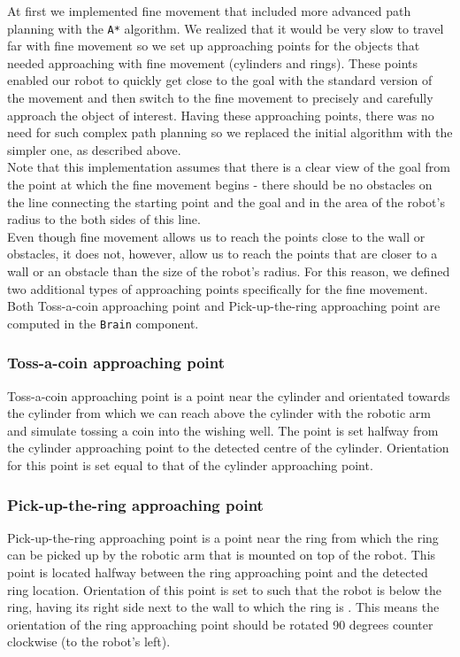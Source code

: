 \documentclass[12pt,a4paper]{article}
\begin{document}
	At first we implemented fine movement that included more advanced path planning with the \texttt{A*} algorithm. We realized that it would be very slow to travel far with fine movement so we set up approaching points for the objects that needed approaching with fine movement (cylinders and rings). These points enabled our robot to quickly get close to the goal with the standard version of the movement and then switch to the fine movement to precisely and carefully approach the object of interest. Having these approaching points, there was no need for such complex path planning so we replaced the initial algorithm with the simpler one, as described above. \\
	
	Note that this implementation assumes that there is a clear view of the goal from the point at which the fine movement begins - there should be no obstacles on the line connecting the starting point and the goal and in the area of the robot's radius to the both sides of this line. \\

	Even though fine movement allows us to reach the points close to the wall or obstacles, it does not, however, allow us to reach the points that are closer to a wall or an obstacle than the size of the robot's radius. For this reason, we defined two additional types of approaching points specifically for the fine movement. Both Toss-a-coin approaching point and Pick-up-the-ring approaching point are computed in the \texttt{Brain} component. \\

	\subsubsection{Toss-a-coin approaching point} \label{toss-a-coin-point}
	Toss-a-coin approaching point is a point near the cylinder and orientated towards the cylinder from which we can reach above the cylinder with the robotic arm and simulate tossing a coin into the wishing well. The point is set halfway from the cylinder approaching point to the detected centre of the cylinder. Orientation for this point is set equal to that of the cylinder approaching point. \\

	\subsubsection{Pick-up-the-ring approaching point} \label{pick-up-the-ring-point}
	Pick-up-the-ring approaching point is a point near the ring from which the ring can be picked up by the robotic arm that is mounted on top of the robot. This point is located halfway between the ring approaching point and the detected ring location. Orientation of this point is set to such that the robot is below the ring, having its right side next to the wall to which the ring is . This means the orientation of the ring approaching point should be rotated 90 degrees counter clockwise (to the robot's left). \\
	
\end{document}
